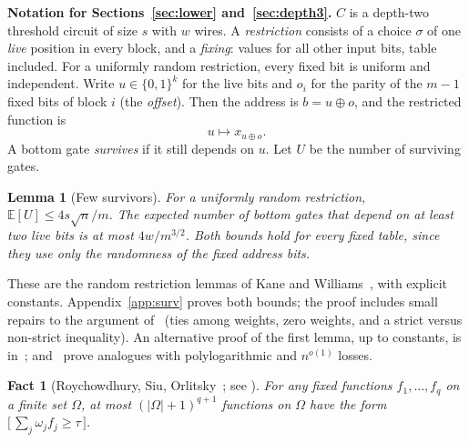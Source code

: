 \documentclass[11pt,letterpaper]{article}
\newtheorem{lemma}[theorem]{Lemma}
\newtheorem{fact}[theorem]{Fact}
\theoremstyle{remark}
\newcommand{\bits}{\{0,1\}}
\newcommand{\ind}[1]{\bigl[\,#1\,\bigr]}
\begin{document}
\begin{keybox}
\textbf{Notation for Sections~\ref{sec:lower} and~\ref{sec:depth3}.}
$C$ is a depth-two threshold circuit of size $s$ with $w$ wires.
A \emph{restriction} consists of a choice $\sigma$ of one \emph{live}
position in every block, and a \emph{fixing}: values for all other input
bits, table included. For a uniformly random restriction, every fixed bit
is uniform and independent. Write $u\in\bits^k$ for the live bits and
$o_i$ for the parity of the $m-1$ fixed bits of block $i$ (the
\emph{offset}). Then the address is $b=u\oplus o$, and the restricted
function is
\[
u\mapsto x_{u\oplus o}.
\]
A bottom gate \emph{survives} if it still depends on $u$. Let $U$ be the
number of surviving gates.
\end{keybox}

\begin{lemma}[Few survivors]\label{lem:surv}
For a uniformly random restriction, $\mathbb E[U]\le4s\sqrt n/m$. The
expected number of bottom gates that depend on at least two live bits is at
most $4w/m^{3/2}$. Both bounds hold for every fixed table, since they use
only the randomness of the fixed address bits.
\end{lemma}
These are the random restriction lemmas of Kane and
Williams~\cite[Lemmas~1.1 and~3.1]{KW}, with explicit constants.
Appendix~\ref{app:surv} proves both bounds; the proof includes small repairs
to the argument of~\cite{KW} (ties among weights, zero weights, and a strict
versus non-strict inequality). An alternative proof of the first lemma, up to
constants, is in~\cite[App.~A.3]{CTW}; \cite[Lemma~6.1]{KKL}
and~\cite[Lemma~9.1]{CSS} prove analogues with polylogarithmic and $n^{o(1)}$
losses.

\begin{fact}[Roychowdhury, Siu, Orlitsky~\cite{RSO}; see {\cite[Thm.~2.3]{KW}}]\label{fact:rso}
For any fixed functions $f_1,\dots,f_q$ on a finite set $\Omega$, at most
$(|\Omega|+1)^{q+1}$ functions on $\Omega$ have the form
$\ind{\sum_j\omega_jf_j\ge\tau}$.
\end{fact}
\end{document}
